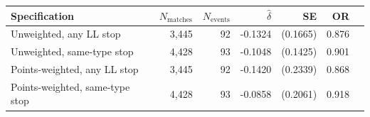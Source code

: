 \begin{tabular}{lrrrrrr}
\toprule
Specification & $N_{\text{matches}}$ & $N_{\text{events}}$ & $\hat{\delta}$ & SE & OR \\
\midrule
Unweighted, any LL stop & 3,445 & 92 & -0.1324 & (0.1665) & 0.876 \\
Unweighted, same-type stop & 4,428 & 93 & -0.1048 & (0.1425) & 0.901 \\
Points-weighted, any LL stop & 3,445 & 92 & -0.1420 & (0.2339) & 0.868 \\
Points-weighted, same-type stop & 4,428 & 93 & -0.0858 & (0.2061) & 0.918 \\
\bottomrule
\end{tabular}
